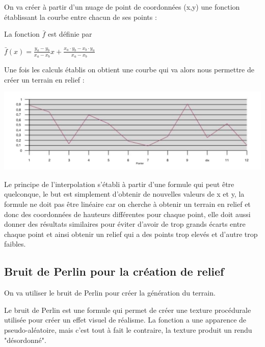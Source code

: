 On va créer à partir d'un nuage de point de coordonnées (x,y) une fonction établissant la courbe entre chacun de ses points : 

La fonction $\bar{f}$ est définie par

\begin{center}
  ${\displaystyle {\bar {f}}(x)={\frac {y_{a}-y_{b}}{x_{a}-x_{b}}}x+{\frac {x_{a}\cdot y_{b}-x_{b}\cdot y_{a}}{x_{a}-x_{b}}}}$ \\
\end{center}

Une fois les calculs établis on obtient une courbe qui va alors nous permettre de créer un terrain en relief : 

\begin{center}
  \includegraphics[height = 4 cm]{images/interlineaire.jpeg}\\
  \cite{Kelly}
\end{center}

Le principe de l'interpolation s'établi à partir d'une formule qui peut être quelconque, le but est simplement d'obtenir de nouvelles valeurs de x et y, la formule ne doit pas être linéaire car on cherche à obtenir un terrain en relief et donc des coordonnées de hauteurs différentes pour chaque point, elle doit aussi donner des résultats similaires pour éviter d'avoir de trop grands écarts entre chaque point et ainsi obtenir un relief qui a des points trop elevés et d'autre trop faibles.

\subsection{Bruit de Perlin pour la création de relief}
On va utiliser le bruit de Perlin pour créer la génération du terrain.  

Le bruit de Perlin est une formule qui permet de créer une texture procédurale utilisée pour créer un effet visuel de réalisme. La fonction a une apparence de pseudo-aléatoire, mais c'est tout à fait le contraire, la texture produit un rendu "désordonné".

